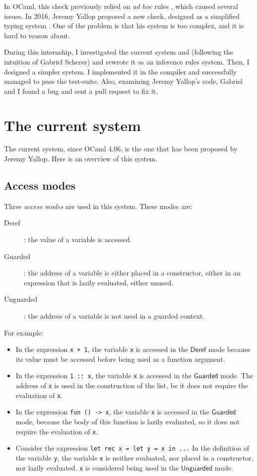 \documentclass{article}
\newcommand{\Deref}{\mathsf{Deref}}
\newcommand{\Unguarded}{\mathsf{Unguarded}}
\newcommand{\Guarded}{\mathsf{Guarded}}
\begin{document}
In OCaml, this check previously relied on \textit{ad hoc} rules
\cite{PreviousRules}, which caused several issues. In 2016, Jeremy Yallop
proposed a new check, designed as a simplified typing system \cite{Yallop}.
One of the problem is that his system is too complex, and it is hard to reason
about.

During this internship, I investigated the current system and (following the
intuition of Gabriel Scherer) and rewrote it as an inference rules system. Then,
I designed a simpler system. I implemented it in the compiler and successfully
managed to pass the test-suite. Also, examining Jeremy Yallop's code, Gabriel
and I found a bug and sent a pull request to fix it.

\section{The current system}
The current system, since OCaml 4.06, is the one that has been proposed by
Jeremy Yallop. Here is an overview of this system.

\subsection{Access modes}
Three \textit{access modes} are used in this system. These modes are:
\begin{description}
  \item[Deref] : the value of a variable is accessed.
  \item[Guarded] : the address of a variable is either placed in a constructor,
    either in an expression that is lazily evaluated, either unused.
  \item[Unguarded] : the address of a variable is not used in a guarded
    context.
\end{description}

For example:
\begin{itemize}
  \item In the expression \lstinline|x + 1|, the variable \lstinline|x| is
    accessed in the $\Deref$ mode because its value must be accessed before
    being used as a function argument.
  \item In the expression \lstinline|1 :: x|, the variable \lstinline|x| is 
    accessed in the $\Guarded$ mode. The address of \lstinline|x| is used in
    the construction of the list, be it does not require the evaluation of
    \lstinline|x|.
  \item In the expression \lstinline|fun () -> x|, the variable \lstinline|x|
    is accessed in the $\Guarded$ mode, because the body of this function is
    lazily evaluated, so it does not require the evaluation of \lstinline|x|.
  \item Consider the expression \lstinline |let rec x = let y = x in ...|
    In the definition of the variable \lstinline|y|, the variable
    \lstinline|x| is neither evaluated, nor placed in a constructor, nor lazily
    evaluated. \lstinline|x| is considered being used in the $\Unguarded$ mode.
\end{itemize}
\end{document}
